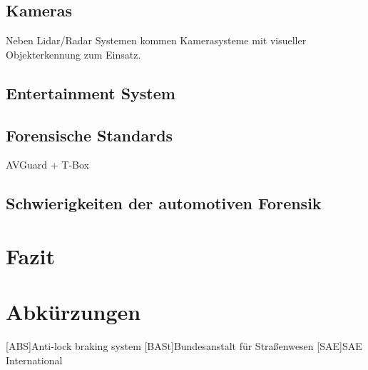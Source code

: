 \documentclass[conference,compsoc,final,a4paper]{IEEEtran}
\begin{document}
\subsection{Kameras}

Neben Lidar/Radar Systemen kommen Kamerasysteme mit visueller Objekterkennung zum Einsatz.

\subsection{Entertainment System}

\subsection{Forensische Standards}

AVGuard + T-Box

\subsection{Schwierigkeiten der automotiven Forensik}

\section{Fazit}
\section*{Abkürzungen}

\begin{acronym}[IEEE]
  [ABS]{Anti-lock braking system}
  [BASt]{Bundesanstalt für Straßenwesen}
  [SAE]{SAE International}
\end{acronym}

\printbibliography
\end{document}
